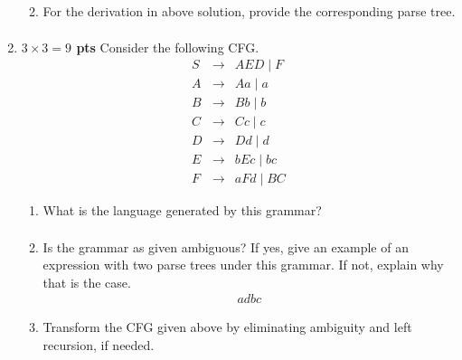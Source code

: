 \documentclass[10pt]{article}
\newcommand {\pts}[1]{{\bf #1 pts}}
\begin{document}
\begin{enumerate}
\begin{enumerate}
            \begin{equation*}\begin{aligned}
            \end{aligned}\end{equation*}
  \item For the derivation in above solution, provide the corresponding parse tree.
            \begin{equation*}\begin{aligned}
            \end{aligned}\end{equation*}
\end{enumerate}



   \newpage

\item \pts{$3\times 3= 9$} Consider the following CFG.
\[\begin{array}{cll}
S & \rightarrow & AED \mid F \\
A & \rightarrow & Aa \mid a \\
B & \rightarrow & Bb \mid b \\
C & \rightarrow & Cc \mid c \\
D & \rightarrow & Dd \mid d \\
E & \rightarrow & bEc \mid bc \\
F & \rightarrow & aFd \mid BC
\end{array}\]

\begin{enumerate}
\item What is the language generated by this grammar?
            \begin{equation*}\begin{aligned}
            \end{aligned}\end{equation*}
\item Is the grammar as given ambiguous? If yes, give an example of an expression
with two parse trees under this grammar. If not, explain why that is the case.
            \begin{equation*}\begin{aligned}
            adbc
            \end{aligned}\end{equation*}
\item Transform the CFG given above by eliminating ambiguity and
left recursion, if needed.
            \begin{equation*}\begin{aligned}
            \end{aligned}\end{equation*}
\end{enumerate}



\end{enumerate}
\end{document}
